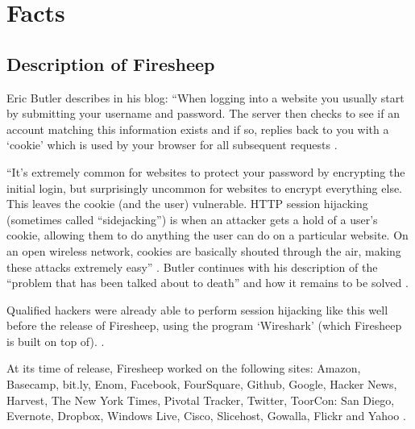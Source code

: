 \documentclass[12pt,twocolumn]{article}
\begin{document}
\section{Facts}

\subsection{Description of Firesheep}
Eric Butler describes in his blog: ``When logging into a website you usually start by submitting your username and password. The server then checks to see if an account matching this information exists and if so, replies back to you with a `cookie' which is used by your browser for all subsequent requests \cite{eric-butler}.

``It's extremely common for websites to protect your password by encrypting the initial login, but surprisingly uncommon for websites to encrypt everything else. This leaves the cookie (and the user) vulnerable. HTTP session hijacking (sometimes called ``sidejacking'') is when an attacker gets a hold of a user's cookie, allowing them to do anything the user can do on a particular website. On an open wireless network, cookies are basically shouted through the air, making these attacks extremely easy'' \cite{eric-butler}. Butler continues with his description of the ``problem that has been talked about to death'' and how it remains to be solved \cite{eric-butler}. 

Qualified hackers were already able to perform session hijacking like this well before the release of Firesheep, using the program `Wireshark' (which Firesheep is built on top of). \cite{wireshark}.

At its time of release, Firesheep worked on the following sites: Amazon, Basecamp, bit.ly, Enom, Facebook, FourSquare, Github, Google, Hacker News, Harvest, The New York Times, Pivotal Tracker, Twitter, ToorCon: San Diego, Evernote, Dropbox, Windows Live, Cisco, Slicehost, Gowalla, Flickr and Yahoo \cite{firesheep-source}.
\end{document}
